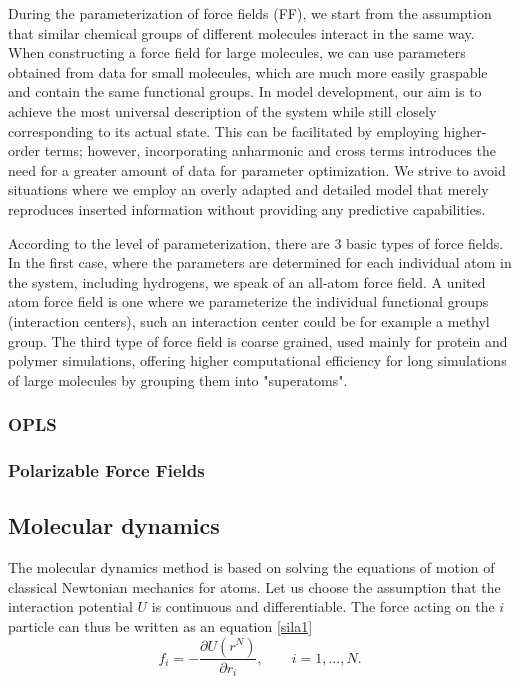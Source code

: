 During the parameterization of force fields (FF), we start from the assumption that similar chemical groups of different molecules interact in the same way. When constructing a force field for large molecules, we can use parameters obtained from data for small molecules, which are much more easily graspable and contain the same functional groups. \cite{monticelli_force_2013} In model development, our aim is to achieve the most universal description of the system while still closely corresponding to its actual state. This can be facilitated by employing higher-order terms; however, incorporating anharmonic and cross terms introduces the need for a greater amount of data for parameter optimization. We strive to avoid situations where we employ an overly adapted and detailed model that merely reproduces inserted information without providing any predictive capabilities. \cite{vanommeslaeghe_molecular_2014}

According to the level of parameterization, there are 3 basic types of force fields. In the first case, where the parameters are determined for each individual atom in the system, including hydrogens, we speak of an all-atom force field. A united atom force field is one where we parameterize the individual functional groups (interaction centers), such an interaction center could be for example a methyl group. The third type of force field is coarse grained, used mainly for protein and polymer simulations, offering higher computational efficiency for long simulations of large molecules by grouping them into "superatoms". \cite{da_silva_are_2020}

\subsubsection{OPLS}

\subsubsection{Polarizable Force Fields}

\subsection{Molecular dynamics}
The molecular dynamics method is based on solving the equations of motion of classical Newtonian mechanics for atoms. Let us choose the assumption that the interaction potential $U$ is continuous and differentiable. The force acting on the $i$ particle can thus be written as an equation \ref{sila1} 
\begin{equation}\label{sila1}
	f_i=-\frac{\partial U(r^N)}{\partial r_i}, \qquad i=1,...,N.
\end{equation}

